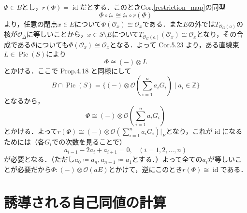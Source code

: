 \documentclass[uplatex,a4paper,11pt,dvipdfmx]{jsarticle}
\makeatletter
\theoremstyle{mystyle} %
\renewenvironment{proof}[1][\proofname]{\par
 \pushQED{\qed}%
 \normalfont \topsep6\p@\@plus6\p@\relax
 \trivlist
 \item[\hskip\labelsep
 \itshape
 {\bf\underline{#1}}]\ignorespaces
}{%
 \popQED\endtrivlist\@endpefalse
}
\DeclareMathOperator{\Pic}{Pic}
\DeclareMathOperator{\id}{id}
\makeatother
\begin{document}
\begin{proof}
	$\Phi \in B$とし，$r(\Phi) = \id$だとする．このときCor.\ref{restriction_map}の同型$$\Phi \circ i_* \cong i_* \circ r(\Phi)$$より，任意の閉点$x \in E$について$\Phi(\mathcal{O}_x) \cong \mathcal{O}_x$である．また$E$の外では$T_{\mathcal{O}_G(a)}$の核が$\mathcal{O}_\Delta$に等しいことから，$x \in S\setminus E$について$T_{\mathcal{O}_G(a)}(\mathcal{O}_x) \cong \mathcal{O}_x$となり，その合成である$\Phi$についても$\Phi(\mathcal{O}_x) \cong\mathcal{O}_x$となる．よって\cite{Huy06} Cor.5.23 より，ある直線束$L \in \Pic(S)$により$$\Phi \cong (-)\otimes L$$とかける．ここで\cite{IU05} Prop.4.18 と同様にして$$B \cap \Pic(S) = \{ (-)\otimes \mathcal{O}(\sum_{i=1}^n a_iG_i) \mid a_i \in \mathbb{Z}\}$$となるから，$$\Phi \cong (-)\otimes \mathcal{O}(\sum_{i=1}^n a_iG_i)$$とかける．よって$r(\Phi) \cong (-)\otimes \mathcal{O}(\sum_{i=1}^n a_iG_i)|_E$となり，これが$\id$になるためには（各$G_i$での次数を見ることで）$$a_{i-1} - 2a_i + a_{i+1} = 0, \hspace{10pt} (i = 1, 2, \dots, n)$$が必要となる．（ただし$a_0 \coloneqq a_n, a_{n+1} \coloneqq a_1$とする．）よって全ての$a_i$が等しいことが必要だから$\Phi \colon (-)\otimes \mathcal{O}(aE)$とかけて，逆にこのとき$r(\Phi) \cong \id$である．
\end{proof}

\section{誘導される自己同値の計算}
\end{document}
